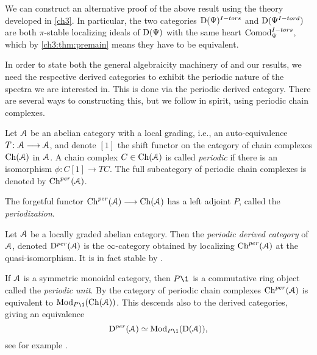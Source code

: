 \begin{addendum}
    We can construct an alternative proof of the above result using the theory developed in \cref{ch3}. In particular, the two categories $\mathrm{D}(\Psi)^{I-tors}$ and $\mathrm{D}(\Psi^{I-tord})$ are both $\pi$-stable localizing ideals of $\mathrm{D}(\Psi)$ with the same heart $\mathrm{Comod}_\Psi^{I-tors}$, which by \cref{ch3:thm:premain} means they have to be equivalent. 
\end{addendum}

In order to state both the general algebraicity machinery of \cite{patchkoria-pstragowski_2021} and our results, we need the respective derived categories to exhibit the periodic nature of the spectra we are interested in. This is done via the periodic derived category. There are several ways to constructing this, but we follow \cite{franke_96} in spirit, using periodic chain complexes. 

\begin{definition}
    \label{ch1:def:periodic-chain-complex}
    Let $\EuScript{A}$ be an abelian category with a local grading, i.e., an auto-equivalence $T\colon \EuScript{A}\longrightarrow\EuScript{A}$, and denote $[1]$ the shift functor on the category of chain complexes $\mathrm{Ch}(\EuScript{A})$ in $\EuScript{A}$. A chain complex $C\in \mathrm{Ch}(\EuScript{A})$ is called \emph{periodic} if there is an isomorphism $\phi\colon C[1]\longrightarrow TC$. The full subcategory of periodic chain complexes is denoted by $\mathrm{Ch}^{per}(\EuScript{A})$. 
\end{definition}

\begin{definition}
    The forgetful functor $\mathrm{Ch}^{per}(\EuScript{A})\longrightarrow \mathrm{Ch}(\EuScript{A})$ has a left adjoint $P$, called the \emph{periodization}. 
\end{definition}

\begin{definition}
    \label{ch1:def:periodic-derived-category}
    Let $\EuScript{A}$ be a locally graded abelian category. Then the \emph{periodic derived category} of $\EuScript{A}$, denoted $\mathrm{D}^{per}(\EuScript{A})$ is the $\infty$-category obtained by localizing $\mathrm{Ch}^{per}(\EuScript{A})$ at the quasi-isomorphism. It is in fact stable by \cite[7.8]{patchkoria-pstragowski_2021}. 
\end{definition}

\begin{remark}
    \label{ch1:rm:periodic-derived-as-modules}
    If $\EuScript{A}$ is a symmetric monoidal category, then $P\1$ is a commutative ring object called the \emph{periodic unit}. By \cite[2.3]{barnes-roitzheim_2011} the category of periodic chain complexes $\mathrm{Ch}^{per}(\EuScript{A})$ is equivalent to $\Mod_{P\1}(\Ch(\A))$. This descends also to the derived categories, giving an equivalence 
    $$\Dper(\A)\simeq \Mod_{P\1}(\Der(\A)),$$
    see for example \cite[3.7]{pstragowski_2021}. 
\end{remark}

